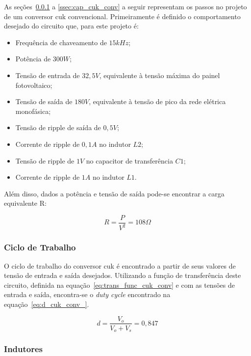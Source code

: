 \documentclass[
	12pt,				%
	openany,
	onseside,
	a4paper,			%
	english,			%
	french,				%
	spanish,			%
	brazil,				%
	]{abntex2}
\begin{document}
As seções~\ref{ssec:d_cuk_conv} a \ref{ssec:cap_cuk_conv} a seguir representam os passos no projeto de um conversor cuk convencional. Primeiramente é definido o comportamento desejado do circuito que, para este projeto é:

\begin{itemize}%
	\item Frequência de chaveamento de $15kHz$;
	\item Potência de $300W$;
	\item Tensão de entrada de $32,5V$, equivalente à tensão máxima do painel fotovoltaico;
	\item Tensão de saída de $180V$, equivalente à tensão de pico da rede elétrica monofásica;
	\item Tensão de ripple de saída de $0,5V$;
	\item Corrente de ripple de $0,1A$ no indutor $L2$;
	\item Tensão de ripple de $1V$ no capacitor de transferência $C1$;
	\item Corrente de ripple de $1A$ no indutor $L1$.
\end{itemize}

Além disso, dados a potência e tensão de saída pode-se encontrar a carga equivalente R:

\begin{equation}%
	R = \frac{P}{V^2} = 108 \Omega \label{eq:cuk_load}
\end{equation}

\subsubsection{Ciclo de Trabalho}\label{ssec:d_cuk_conv}

O ciclo de trabalho do conversor cuk é encontrado a partir de seus valores de tensão de entrada e saída desejados. Utilizando a função de transferência deste circuito, definida na equação~\ref{eq:trans_func_cuk_conv} e com as tensões de entrada e saída, encontra-se o \textit{duty cycle} encontrado na equação~\ref{eq:d_cuk_conv_}.

\begin{equation}%
	d = \frac{V_{o}}{V_{o}+V_{s}} = 0,847 \label{eq:d_cuk_conv_}
\end{equation}

\subsubsection{Indutores}
\end{document}
